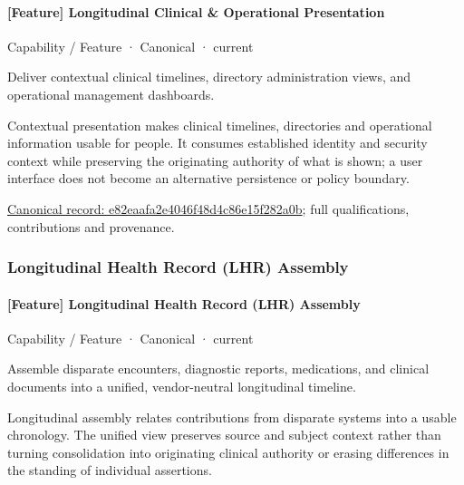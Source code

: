 \paragraph{[Feature] Longitudinal Clinical \& Operational Presentation}

\label{element:e82eaafa2e4046f48d4c86e15f282a0b}
{\small Capability / Feature · Canonical · current}\par

Deliver contextual clinical timelines, directory administration views, and operational management dashboards.



Contextual presentation makes clinical timelines, directories and operational information usable for people. It consumes established identity and security context while preserving the originating authority of what is shown; a user interface does not become an alternative persistence or policy boundary.


{\footnotesize \href{../../../../continuum/strategy/capability/feature/e82eaafa2e4046f48d4c86e15f282a0b.md}{Canonical record: e82eaafa2e4046f48d4c86e15f282a0b}; full qualifications, contributions and provenance.}\par
\subsubsection{Longitudinal Health Record (LHR) Assembly}

\paragraph{[Feature] Longitudinal Health Record (LHR) Assembly}

\label{element:c9c1c7a58cb5470db0141329ecc349f4}
{\small Capability / Feature · Canonical · current}\par

Assemble disparate encounters, diagnostic reports, medications, and clinical documents into a unified, vendor-neutral longitudinal timeline.



Longitudinal assembly relates contributions from disparate systems into a usable chronology. The unified view preserves source and subject context rather than turning consolidation into originating clinical authority or erasing differences in the standing of individual assertions.


